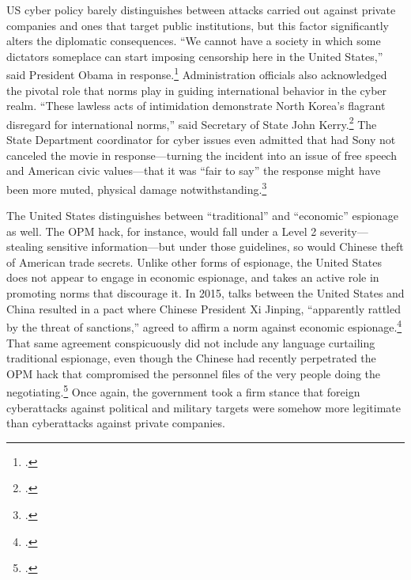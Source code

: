 \documentclass[11pt]{memoir}
\begin{document}
\begin{refsegment}
US cyber policy barely distinguishes between attacks carried out against private companies and ones that target public institutions, but this factor significantly alters the diplomatic consequences. ``We cannot have a society in which some dictators someplace can start imposing censorship here in the United States,'' said President Obama in response.\footcite{perez_obama_2014} Administration officials also acknowledged the pivotal role that norms play in guiding international behavior in the cyber realm. ``These lawless acts of intimidation demonstrate North Korea's flagrant disregard for international norms,'' said Secretary of State John Kerry.\footcite{perez_obama_2014} The State Department coordinator for cyber issues even admitted that had Sony not canceled the movie in response---turning the incident into an issue of free speech and American civic values---that it was ``fair to say'' the response might have been more muted, physical damage notwithstanding.\footcite{nakashima_why_2015}


The United States distinguishes between ``traditional'' and ``economic'' espionage as well. The OPM hack, for instance, would fall under a Level 2 severity---stealing sensitive information---but under those guidelines, so would Chinese theft of American trade secrets. Unlike other forms of espionage, the United States does not appear to engage in economic espionage, and takes an active role in promoting norms that discourage it. In 2015, talks between the United States and China resulted in a pact where Chinese President Xi Jinping, ``apparently rattled by the threat of sanctions,'' agreed to affirm a norm against economic espionage.\footcite{nakashima_u.s._2015} That same agreement conspicuously did not include any language curtailing traditional espionage, even though the Chinese had recently perpetrated the OPM hack that compromised the personnel files of the very people doing the negotiating.\footcite{nakashima_u.s._2015} Once again, the government took a firm stance that foreign cyberattacks against political and military targets were somehow more legitimate than cyberattacks against private companies.


\end{refsegment}
\end{document}
